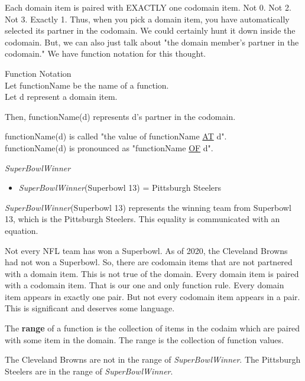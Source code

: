 \documentclass{ximera}
\begin{document}
Each domain item is paired with EXACTLY one codomain item.  Not 0. Not 2.  Not 3.  Exactly 1.  Thus, when you pick a domain item, you have automatically selected its partner in the codomain.  We could certainly hunt it down inside the codomain.  But, we can also just talk about "the domain member's partner in the codomain."  We have function notation for this thought.

\begin{notation} Function Notation \\

Let functionName be the name of a function. \\
Let d represent a domain item.

Then, functionName(d) represents d's partner in the codomain.

functionName(d) is called "the value of functionName \underline{AT} d". \\
functionName(d) is pronounced as "functionName \underline{OF} d".
\end{notation}



\begin{example} \textit{SuperBowlWinner}

\begin{itemize}
\item \textit{SuperBowlWinner}(Superbowl 13) = Pittsburgh Steelers  
\end{itemize}

\textit{SuperBowlWinner}(Superbowl 13) represents the winning team from Superbowl 13, which is the Pittsburgh Steelers.  This equality is communicated with an equation.

\end{example}

Not every NFL team has won a Superbowl. As of 2020, the Cleveland Browns had not won a Superbowl.  So, there are codomain items that are not partnered with a domain item.  This is not true of the domain.  Every domain item is paired with a codomain item.  That is our one and only function rule.  Every domain item appears in exactly one pair.  But not every codomain item appears in a pair.  This is significant and deserves some language.

The \textbf{range} of a function is the collection of items in the codaim which are paired with some item in the domain.  The range is the collection of function values.

The Cleveland Browns are not in the range of \textit{SuperBowlWinner}.  The Pittsburgh Steelers are in the range of \textit{SuperBowlWinner}.
\end{document}
